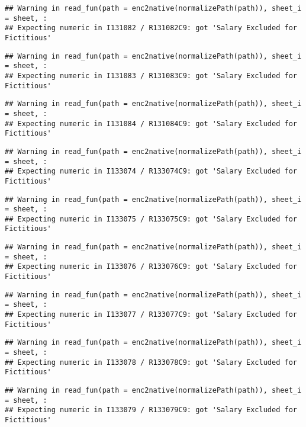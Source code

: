 \documentclass[
]{article}
\begin{document}
\begin{verbatim}
## Warning in read_fun(path = enc2native(normalizePath(path)), sheet_i = sheet, :
## Expecting numeric in I131082 / R131082C9: got 'Salary Excluded for Fictitious'
\end{verbatim}

\begin{verbatim}
## Warning in read_fun(path = enc2native(normalizePath(path)), sheet_i = sheet, :
## Expecting numeric in I131083 / R131083C9: got 'Salary Excluded for Fictitious'
\end{verbatim}

\begin{verbatim}
## Warning in read_fun(path = enc2native(normalizePath(path)), sheet_i = sheet, :
## Expecting numeric in I131084 / R131084C9: got 'Salary Excluded for Fictitious'
\end{verbatim}

\begin{verbatim}
## Warning in read_fun(path = enc2native(normalizePath(path)), sheet_i = sheet, :
## Expecting numeric in I133074 / R133074C9: got 'Salary Excluded for Fictitious'
\end{verbatim}

\begin{verbatim}
## Warning in read_fun(path = enc2native(normalizePath(path)), sheet_i = sheet, :
## Expecting numeric in I133075 / R133075C9: got 'Salary Excluded for Fictitious'
\end{verbatim}

\begin{verbatim}
## Warning in read_fun(path = enc2native(normalizePath(path)), sheet_i = sheet, :
## Expecting numeric in I133076 / R133076C9: got 'Salary Excluded for Fictitious'
\end{verbatim}

\begin{verbatim}
## Warning in read_fun(path = enc2native(normalizePath(path)), sheet_i = sheet, :
## Expecting numeric in I133077 / R133077C9: got 'Salary Excluded for Fictitious'
\end{verbatim}

\begin{verbatim}
## Warning in read_fun(path = enc2native(normalizePath(path)), sheet_i = sheet, :
## Expecting numeric in I133078 / R133078C9: got 'Salary Excluded for Fictitious'
\end{verbatim}

\begin{verbatim}
## Warning in read_fun(path = enc2native(normalizePath(path)), sheet_i = sheet, :
## Expecting numeric in I133079 / R133079C9: got 'Salary Excluded for Fictitious'
\end{verbatim}
\end{document}
